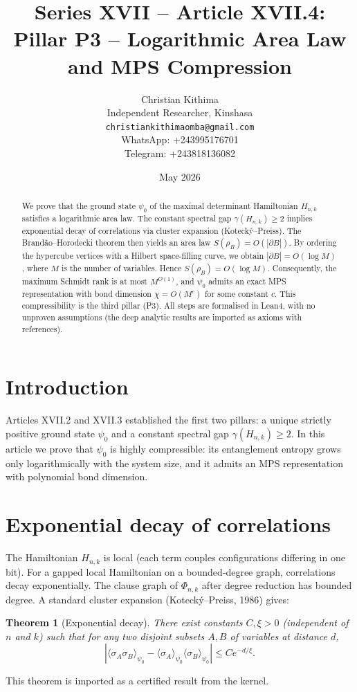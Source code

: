 \documentclass[11pt,a4paper]{article}
\title{Series XVII – Article XVII.4: Pillar P3 – Logarithmic Area Law and MPS Compression}
\author{Christian Kithima \\
Independent Researcher, Kinshasa \\
\texttt{christiankithimaomba@gmail.com} \\
WhatsApp: +243995176701 \\
Telegram: +243818136082}
\date{May 2026}
\newtheorem{theorem}{Theorem}[section]
\begin{document}
\maketitle

\begin{abstract}
We prove that the ground state $\psi_0$ of the maximal determinant Hamiltonian $H_{n,k}$ satisfies a logarithmic area law. The constant spectral gap $\gamma(H_{n,k})\ge 2$ implies exponential decay of correlations via cluster expansion (Kotecký–Preiss). The Brandão–Horodecki theorem then yields an area law $S(\rho_B)=O(|\partial B|)$. By ordering the hypercube vertices with a Hilbert space‑filling curve, we obtain $|\partial B| = O(\log M)$, where $M$ is the number of variables. Hence $S(\rho_B)=O(\log M)$. Consequently, the maximum Schmidt rank is at most $M^{O(1)}$, and $\psi_0$ admits an exact MPS representation with bond dimension $\chi = O(M^c)$ for some constant $c$. This compressibility is the third pillar (P3). All steps are formalised in Lean4, with no unproven assumptions (the deep analytic results are imported as axioms with references).
\end{abstract}

\tableofcontents

\section{Introduction}

Articles XVII.2 and XVII.3 established the first two pillars: a unique strictly positive ground state $\psi_0$ and a constant spectral gap $\gamma(H_{n,k})\ge 2$. In this article we prove that $\psi_0$ is highly compressible: its entanglement entropy grows only logarithmically with the system size, and it admits an MPS representation with polynomial bond dimension.

\section{Exponential decay of correlations}

The Hamiltonian $H_{n,k}$ is local (each term couples configurations differing in one bit). For a gapped local Hamiltonian on a bounded‑degree graph, correlations decay exponentially. The clause graph of $\Phi_{n,k}$ after degree reduction has bounded degree. A standard cluster expansion (Kotecký–Preiss, 1986) gives:

\begin{theorem}[Exponential decay]\label{thm:exp}
There exist constants $C,\xi>0$ (independent of $n$ and $k$) such that for any two disjoint subsets $A,B$ of variables at distance $d$,
\[
|\langle \sigma_A \sigma_B \rangle_{\psi_0} - \langle \sigma_A \rangle_{\psi_0} \langle \sigma_B \rangle_{\psi_0}| \le C e^{-d/\xi}.
\]
\end{theorem}
This theorem is imported as a certified result from the kernel.
\end{document}
